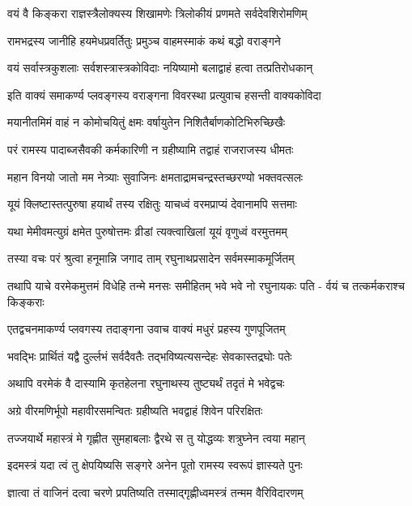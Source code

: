 \twolineshloka
{वयं वै किङ्करा राज्ञस्त्रैलोक्यस्य शिखामणेः}
{त्रिलोकीयं प्रणमते सर्वदेवशिरोमणिम्}%

\twolineshloka
{रामभद्रस्य जानीहि हयमेधप्रवर्तितुः}
{प्रमुञ्च वाहमस्माकं कथं बद्धो वराङ्गने}%

\twolineshloka
{वयं सर्वास्त्रकुशलाः सर्वशस्त्रास्त्रकोविदाः}
{नयिष्यामो बलाद्वाहं हत्वा तत्प्रतिरोधकान्}%

\twolineshloka
{इति वाक्यं समाकर्ण्य प्लवङ्गस्य वराङ्गना}
{विवरस्था प्रत्युवाच हसन्ती वाक्यकोविदा}%

\twolineshloka
{मयानीतमिमं वाहं न कोमोचयितुं क्षमः}
{वर्षायुतेन निशितैर्बाणकोटिभिरुच्छिखैः}%

\twolineshloka
{परं रामस्य पादाब्जसैवकी कर्मकारिणी}
{न ग्रहीष्यामि तद्वाहं राजराजस्य धीमतः}%

\twolineshloka
{महान विनयो जातो मम नेत्र्याः सुवाजिनः}
{क्षमताद्रामचन्द्रस्तच्छरण्यो भक्तवत्सलः}%

\twolineshloka
{यूयं क्लिष्टास्तत्पुरुषा हयार्थं तस्य रक्षितुः}
{याचध्वं वरमप्राप्यं देवानामपि सत्तमाः}%

\twolineshloka
{यथा मेमीवमत्युग्रं क्षमेत पुरुषोत्तमः}
{व्रीडां त्यक्त्वाखिलां यूयं वृणुध्वं वरमुत्तमम्}%

\twolineshloka
{तस्या वचः परं श्रुत्वा हनूमान्नि जगाद ताम्}
{रघुनाथप्रसादेन सर्वमस्माकमूर्जितम्}%

\fourlineindentedshloka
{तथापि याचे वरमेकमुत्तमं}
{विधेहि तन्मे मनसः समीहितम्}
{भवे भवे नो रघुनायकः पति -}
{र्वयं च तत्कर्मकराश्च किङ्कराः}%

\twolineshloka
{एतद्वचनमाकर्ण्य प्लवगस्य तदाङ्गना}
{उवाच वाक्यं मधुरं प्रहस्य गुणपूजितम्}%

\twolineshloka
{भवद्भिः प्रार्थितं यद्वै दुर्ल्लभं सर्वदैवतैः}
{तद्भविष्यत्यसन्देहः सेवकास्तद्रघोः पतेः}%

\twolineshloka
{अथापि वरमेकं वै दास्यामि कृतहेलना}
{रघुनाथस्य तुष्ट्यर्थं तदृतं मे भवेद्वचः}%

\twolineshloka
{अग्रे वीरमणिर्भूपो महावीरसमन्वितः}
{ग्रहीष्यति भवद्वाहं शिवेन परिरक्षितः}%

\twolineshloka
{तज्जयार्थे महास्त्रं मे गृह्णीत सुमहाबलाः}
{द्वैरथे स तु योद्धव्यः शत्रुघ्नेन त्वया महान्}%

\twolineshloka
{इदमस्त्रं यदा त्वं तु क्षेपयिष्यसि सङ्गरे}
{अनेन पूतो रामस्य स्वरूपं ज्ञास्यते पुनः}%

\twolineshloka
{ज्ञात्वा तं वाजिनं दत्वा चरणे प्रपतिष्यति}
{तस्माद्गृह्णीध्वमस्त्रं तन्मम वैरिविदारणम्}%

